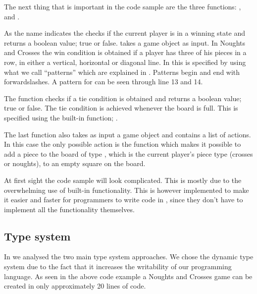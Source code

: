 
The next thing that is important in the code sample are the three functions: 
,  and . 

As the name indicates the  checks if the current player
is in a winning state and returns a boolean value; true or false.
 takes a game object as input. In Noughts and Crosses the
win condition is obtained if a player has three of his pieces in a row, in
either a vertical, horizontal or diagonal line. In \productname{} this is
specified by using what we call ``patterns'' which are explained in
. Patterns begin and end with forwardslashes. A pattern for
 can be seen through line 13 and 14.

The  function checks if a tie condition is obtained and
returns a boolean value; true or false. The tie condition is achieved whenever
the board is full. This is specified using the built-in function;
. 

The last function  also takes as input a game object and
contains a list of actions. In this case the only possible action is the
 function which makes it possible to add a piece to the
board of type , which is the current player's piece type (crosses
or noughts), to an empty square on the board.

At first sight the code sample will look complicated. This is mostly due to the
overwhelming use of built-in functionality. This is however implemented to make
it easier and faster for programmers to write code in \productname{}, since they
don't have to implement all the functionality themselves.

\subsection*{Type system}

In  we analysed the two main type system
approaches.  We chose the dynamic type system due to the fact that it increases
the writability of our programming language. As seen in the above code example
 a Noughts and Crosses game can be created in only
approximately 20 lines of code.

